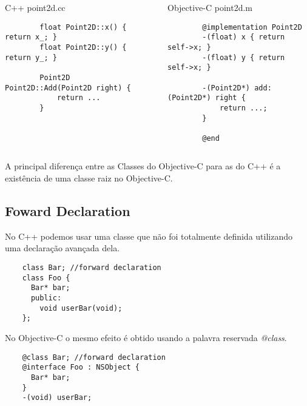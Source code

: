 \documentclass[brazil]{beamer}
\begin{document}
\begin{frame}[fragile]
  \begin{columns}
    \begin{column}{.5\textwidth}
      \begin{center}
        C++
        \vfill
        point2d.cc
      \end{center}
      \lstset{language=C++,basicstyle=\tiny}
      \begin{lstlisting}
        float Point2D::x() { return x_; }
        float Point2D::y() { return y_; }

        Point2D Point2D::Add(Point2D right) {
            return ...
        }
      \end{lstlisting}
    \end{column}
    \begin{column}{.5\textwidth}
      \begin{center}
        Objective-C
        \vfill
        point2d.m
      \end{center}
      \lstset{language=C++,basicstyle=\tiny}
      \begin{lstlisting}
        @implementation Point2D
        -(float) x { return self->x; }
        -(float) y { return self->x; }

        -(Point2D*) add: (Point2D*) right {
            return ...;
        }

        @end
      \end{lstlisting}
    \end{column}
  \end{columns}
\end{frame}

\begin{frame}
  A principal diferença entre as Classes do Objective-C para as do C++ é a existência de uma classe
  raiz no Objective-C.
\end{frame}

\subsection{Foward Declaration}

\begin{frame}[fragile]
  No C++ podemos usar uma classe que não foi totalmente definida utilizando uma declaração avançada dela. \\
  \lstset{language=C++,basicstyle=\tiny}
  \begin{lstlisting}
    class Bar; //forward declaration 
    class Foo { 
      Bar* bar; 
      public:
        void userBar(void);
    };
  \end{lstlisting}
  No Objective-C o mesmo efeito é obtido usando a palavra reservada \textit{@class}.
  \lstset{language=C++,basicstyle=\tiny}
  \begin{lstlisting}
    @class Bar; //forward declaration 
    @interface Foo : NSObject { 
      Bar* bar; 
    }
    -(void) userBar;
  \end{lstlisting}
\end{frame}
\end{document}
